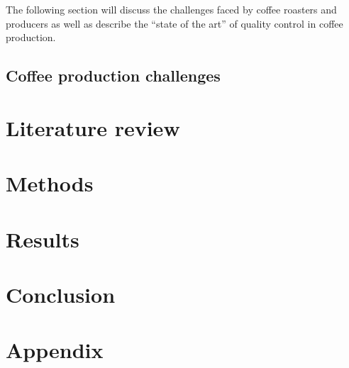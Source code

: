 \documentclass{./styles/UoYCSproject}
\begin{document}
The following section will discuss the challenges faced by coffee roasters and producers
as well as describe the ``state of the art'' of quality control in coffee production.

\section{Coffee production challenges}
\label{sec:coffee-production-challenges}


\chapter{Literature review}
\label{ch:litreview}


\chapter{Methods}
\label{ch:methods}

\chapter{Results}
\label{ch:results}

\chapter{Conclusion}
\label{ch:conclusion}


\appendix
\chapter{Appendix}
\label{ch:appendix}

\printbibliography
\end{document}
